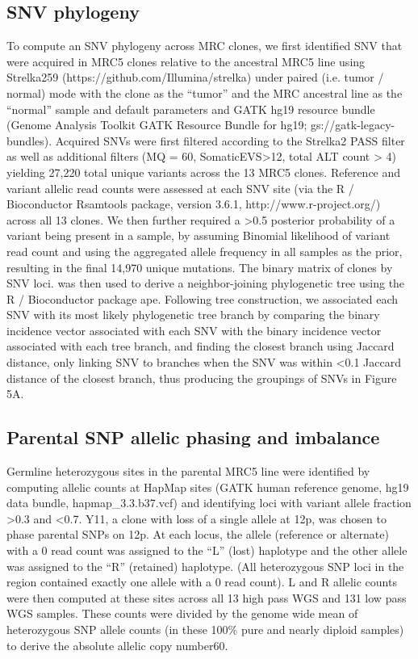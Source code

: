 \documentclass[phd,tocprelim]{cornell}
\begin{document}
\subsection*{SNV phylogeny}
To compute an SNV phylogeny across MRC clones, we first identified SNV that were acquired in MRC5 clones relative to the ancestral MRC5 line using Strelka259 (https://github.com/Illumina/strelka) under paired (i.e. tumor / normal) mode with the clone as the “tumor” and the MRC ancestral line as the “normal” sample and default parameters and GATK hg19 resource bundle (Genome Analysis Toolkit GATK Resource Bundle for hg19; gs://gatk-legacy-bundles). Acquired SNVs were first filtered according to the Strelka2 PASS filter as well as additional filters (MQ = 60, SomaticEVS>12, total ALT count > 4) yielding 27,220 total unique variants across the 13 MRC5 clones. Reference and variant allelic read counts were assessed at each SNV site (via the R / Bioconductor Rsamtools package, version 3.6.1, http://www.r-project.org/) across all 13 clones. We then further required a >0.5 posterior probability of a variant being present in a sample, by assuming Binomial likelihood of variant read count and using the aggregated allele frequency in all samples as the prior, resulting in the final 14,970 unique mutations. The binary matrix of clones by SNV loci. was then used to derive a neighbor-joining phylogenetic tree using the R / Bioconductor package ape. Following tree construction, we associated each SNV with its most likely phylogenetic tree branch by comparing the binary incidence vector associated with each SNV with the binary incidence vector associated with each tree branch, and finding the closest branch using Jaccard distance, only linking SNV to branches when the SNV was within <0.1 Jaccard distance of the closest branch, thus producing the groupings of SNVs in Figure 5A.   

\subsection*{Parental SNP allelic phasing and imbalance}
Germline heterozygous sites in the parental MRC5 line were identified by computing allelic counts at HapMap sites (GATK human reference genome, hg19 data bundle, hapmap\_3.3.b37.vcf) and identifying loci with variant allele fraction >0.3 and <0.7.  Y11, a clone with loss of a single allele at 12p, was chosen to phase parental SNPs on 12p. At each locus, the allele (reference or alternate) with a 0 read count was assigned to the “L” (lost) haplotype and the other allele was assigned to the “R” (retained) haplotype. (All heterozygous SNP loci in the region contained exactly one allele with a 0 read count). L and R allelic counts were then computed at these sites across all 13 high pass WGS and 131 low pass WGS samples. These counts were divided by the genome wide mean of heterozygous SNP allele counts (in these 100\% pure and nearly diploid samples) to derive the absolute allelic copy number60.
\end{document}
